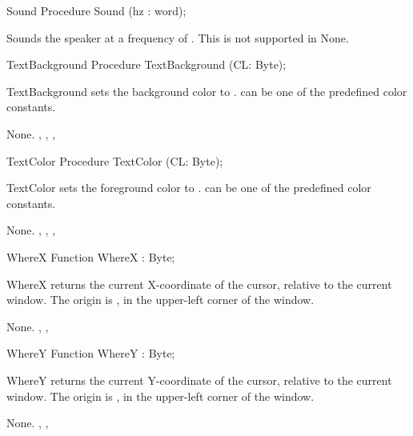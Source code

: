\latex{}
 \html{}
\begin{procedure}{Sound}
\Declaration
Procedure Sound (hz : word);

\Description
 Sounds the speaker at a frequency of .
This is not supported in \linux
\Errors
None.
\SeeAlso
{}
\end{procedure}
\begin{procedure}{TextBackground}
\Declaration
Procedure TextBackground (CL: Byte);

\Description

TextBackground sets the background color to .  can be one of the
predefined color constants.

\Errors
None.
\SeeAlso
 , , ,
\end{procedure}
\latex{}
 \html{}
\begin{procedure}{TextColor}
\Declaration
Procedure TextColor (CL: Byte);

\Description

TextColor sets the foreground color to .  can be one of the
predefined color constants.

\Errors
None.
\SeeAlso
 , , ,
\end{procedure}
\latex{}
 \html{}
\begin{function}{WhereX}
\Declaration
Function WhereX  : Byte;

\Description

WhereX returns the current X-coordinate of the cursor, relative to the
current window. The origin is , in the upper-left corner of the
window.

\Errors
None.
\SeeAlso
 , ,  
\end{function}
\latex{}
 \html{}
\begin{function}{WhereY}
\Declaration
Function WhereY  : Byte;

\Description

WhereY returns the current Y-coordinate of the cursor, relative to the
current window. The origin is , in the upper-left corner of the
window.

\Errors
None.
\SeeAlso
 , ,  
\end{function}
